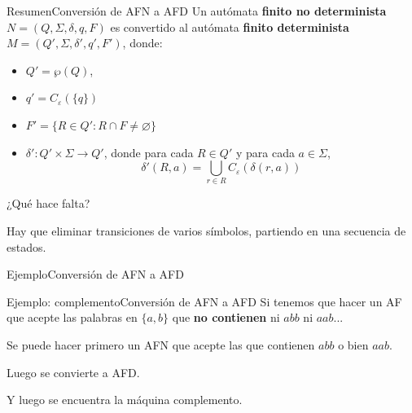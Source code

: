 \documentclass[spanish]{beamer}
\begin{document}
  \begin{frame}{Resumen}{Conversión de AFN a AFD}
      Un autómata \textbf{finito no determinista} $N = (Q, \Sigma, \delta, q, F)$ es convertido al autómata \textbf{finito determinista} $M = (Q', \Sigma, \delta', q', F')$, donde: \pause
      
      \bigskip

      \begin{itemize}
        \itemsep1.5ex
        \item $Q' = \wp(Q)$, \pause
        \item $q'= C_\varepsilon(\{q\})$ \pause
        \item $F' = \{R \in Q' : R \cap F \neq \varnothing\}$ \pause
        \item $\delta' : Q' \times \Sigma \to Q'$, donde para cada $R \in Q'$ y para cada $a \in \Sigma$,
        \[\delta'(R,a) = \bigcup_{r \in R} C_\varepsilon (\delta (r,a))\]
      \end{itemize} \pause

      \bigskip

      ¿Qué hace falta? \pause

      Hay que eliminar transiciones de varios símbolos, partiendo en una secuencia de estados.

  \end{frame}

  \begin{frame}{Ejemplo}{Conversión de AFN a AFD}
    \begin{center}
    \end{center}      
  \end{frame}

  \begin{frame}{Ejemplo: complemento}{Conversión de AFN a AFD}
      Si tenemos que hacer un AF que acepte las palabras en $\{a,b\}$ que \textbf{no contienen} ni $abb$ ni $aab$... \pause

      \bigskip

      Se puede hacer primero un AFN que acepte las que contienen $abb$ o bien $aab$. \pause

      \bigskip

      Luego se convierte a AFD. \pause

      \bigskip

      Y luego se encuentra la máquina complemento.
  \end{frame}
\end{document}
